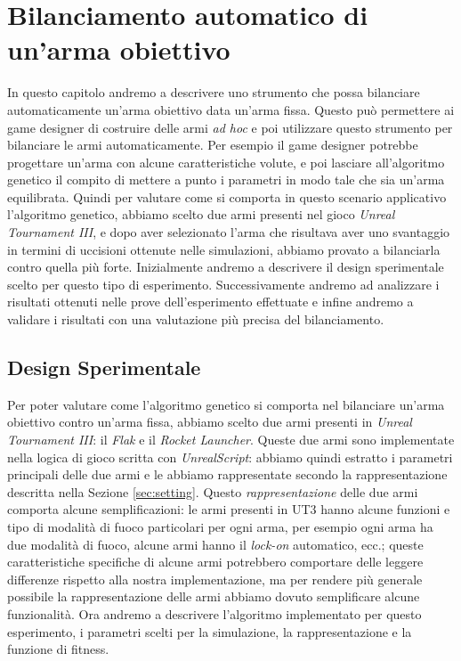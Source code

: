 \documentclass[12pt, italian]{toptesi}
\begin{document}
\chapter{Bilanciamento automatico di un'arma obiettivo}
In questo capitolo andremo a descrivere uno strumento che possa bilanciare automaticamente un'arma obiettivo data un'arma fissa.
Questo può permettere ai game designer di costruire delle armi \emph{ad hoc} e poi utilizzare questo strumento per bilanciare le armi automaticamente.
Per esempio il game designer potrebbe progettare un'arma con alcune caratteristiche volute, e poi lasciare all'algoritmo genetico il compito di mettere a punto i parametri in modo tale che sia un'arma equilibrata.
Quindi per valutare come si comporta in questo scenario applicativo l'algoritmo genetico, abbiamo scelto due armi presenti nel gioco \emph{Unreal Tournament III}, e dopo aver selezionato l'arma che risultava aver uno svantaggio in termini di uccisioni ottenute nelle simulazioni, abbiamo provato a bilanciarla contro quella più forte.
Inizialmente andremo a descrivere il design sperimentale scelto per questo tipo di esperimento.
Successivamente andremo ad analizzare i risultati ottenuti nelle prove dell'esperimento effettuate e infine andremo a validare i risultati con una valutazione più precisa del bilanciamento.

\section{Design Sperimentale}
Per poter valutare come l'algoritmo genetico si comporta nel bilanciare un'arma obiettivo contro un'arma fissa, abbiamo scelto due armi presenti in \emph{Unreal Tournament III}: il \emph{Flak} e il \emph{Rocket Launcher}.
Queste due armi sono implementate nella logica di gioco scritta con \emph{UnrealScript}: abbiamo quindi estratto i parametri principali delle due armi e le abbiamo rappresentate secondo la rappresentazione descritta nella Sezione \ref{sec:setting}.
Questo \emph{rappresentazione} delle due armi comporta alcune semplificazioni: le armi presenti in UT3 hanno alcune funzioni e tipo di modalità di fuoco particolari per ogni arma,  per esempio ogni arma ha due modalità di fuoco, alcune armi hanno il \emph{lock-on} automatico, ecc.; queste caratteristiche specifiche di alcune armi potrebbero comportare delle leggere differenze rispetto alla nostra implementazione, ma per rendere più generale possibile la rappresentazione delle armi abbiamo dovuto semplificare alcune funzionalità.
Ora andremo a descrivere l'algoritmo implementato per questo esperimento, i parametri scelti per la simulazione, la rappresentazione e la funzione di fitness.
\end{document}
